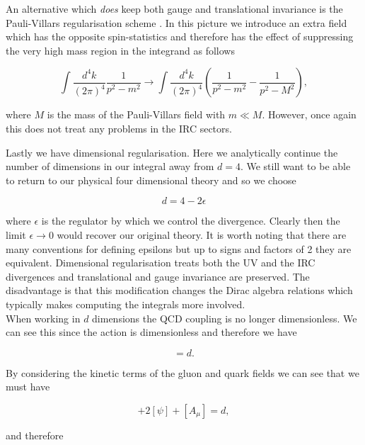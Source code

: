 		An alternative which \emph{does} keep both gauge and translational invariance is the Pauli-Villars
		regularisation scheme \cite{RevModPhys.21.434}.  In this picture we introduce an extra field which has
		the opposite spin-statistics and therefore has the effect of suppressing the very high mass region in
		the integrand as follows

		\begin{equation}
			\int\frac{d^4k}{(2\pi)^4}\frac{1}{p^2-m^2}\rightarrow\int\frac{d^4k}{(2\pi)^4}\left(\frac{1}{p^2-m^2} - \frac{1}{p^2-M^2}\right),
		\end{equation}

		where $M$ is the mass of the Pauli-Villars field with $m\ll M$.  However, once again this does not treat any
		problems in the IRC sectors.

		Lastly we have dimensional regularisation.  Here we analytically continue the
		number of dimensions in our integral away from $d=4$.  We still want to be able to return to our physical four
		dimensional theory and so we choose

		\begin{equation}
			d=4-2\epsilon
		\end{equation}

		where $\epsilon$ is the regulator by which we control the divergence. Clearly then the limit
		$\epsilon\rightarrow 0$ would recover our original theory.  It is worth noting that there are many
		conventions for defining epsilons but up to signs and factors of 2 they are equivalent. Dimensional
		regularisation treats both the UV and the IRC divergences and translational and gauge invariance are
		preserved.  The disadvantage is that this modification changes the Dirac algebra relations which
		typically makes computing the integrals more involved.\\When working in $d$ dimensions the QCD coupling
		is no longer dimensionless.  We can see this since the action is dimensionless and therefore we have

		\begin{equation}
			[\mathcal{L}] = d.
		\end{equation}

		By considering the kinetic terms of the gluon and quark fields we can see that we must have

		\begin{equation}
			[g] + 2[\psi] + [A_\mu] = d,
		\end{equation}

		and therefore

